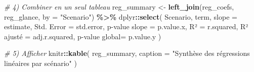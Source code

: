 \documentclass[
]{article}
\newenvironment{Shaded}{\begin{snugshade}}{\end{snugshade}}
\newcommand{\AttributeTok}[1]{\textcolor[rgb]{0.13,0.29,0.53}{#1}}
\newcommand{\CommentTok}[1]{\textcolor[rgb]{0.56,0.35,0.01}{\textit{#1}}}
\newcommand{\FunctionTok}[1]{\textcolor[rgb]{0.13,0.29,0.53}{\textbf{#1}}}
\newcommand{\NormalTok}[1]{#1}
\newcommand{\OtherTok}[1]{\textcolor[rgb]{0.56,0.35,0.01}{#1}}
\newcommand{\SpecialCharTok}[1]{\textcolor[rgb]{0.81,0.36,0.00}{\textbf{#1}}}
\newcommand{\StringTok}[1]{\textcolor[rgb]{0.31,0.60,0.02}{#1}}
\begin{document}
\begin{Shaded}
\begin{Highlighting}[]
\CommentTok{\# 4) Combiner en un seul tableau}
\NormalTok{reg\_summary }\OtherTok{\textless{}{-}} 
  \FunctionTok{left\_join}\NormalTok{(reg\_coefs, reg\_glance, }\AttributeTok{by =} \StringTok{"Scenario"}\NormalTok{) }\SpecialCharTok{\%\textgreater{}\%}
\NormalTok{  dplyr}\SpecialCharTok{::}\FunctionTok{select}\NormalTok{(}
\NormalTok{    Scenario, term, }
    \AttributeTok{slope           =}\NormalTok{ estimate,}
    \StringTok{\textasciigrave{}}\AttributeTok{Std. Error}\StringTok{\textasciigrave{}}    \OtherTok{=}\NormalTok{ std.error,}
    \StringTok{\textasciigrave{}}\AttributeTok{p{-}value slope}\StringTok{\textasciigrave{}} \OtherTok{=}\NormalTok{ p.value.x,}
    \StringTok{\textasciigrave{}}\AttributeTok{R²}\StringTok{\textasciigrave{}}            \OtherTok{=}\NormalTok{ r.squared,}
    \StringTok{\textasciigrave{}}\AttributeTok{R² ajusté}\StringTok{\textasciigrave{}}     \OtherTok{=}\NormalTok{ adj.r.squared,}
    \StringTok{\textasciigrave{}}\AttributeTok{p{-}value global}\StringTok{\textasciigrave{}}\OtherTok{=}\NormalTok{ p.value.y}
\NormalTok{  )}

\CommentTok{\# 5) Afficher}
\NormalTok{knitr}\SpecialCharTok{::}\FunctionTok{kable}\NormalTok{(}
\NormalTok{  reg\_summary,}
  \AttributeTok{caption =} \StringTok{"Synthèse des régressions linéaires par scénario"}
\NormalTok{)}
\end{Highlighting}
\end{Shaded}
\end{document}
